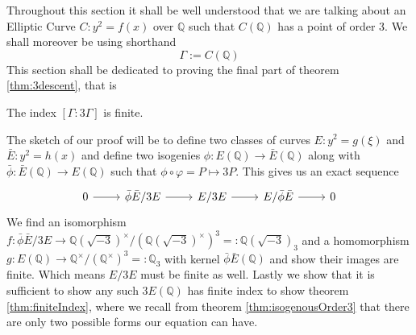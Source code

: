 Throughout this section it shall be well understood that
we are talking about an Elliptic Curve $C: y^2 = f(x)$
over $\mathbb{Q}$ such that $C(\mathbb{Q})$ has a point of order 3.
We shall moreover be using shorthand
\begin{equation*}
  \Gamma := C(\mathbb{Q})
\end{equation*}
This section shall be dedicated to proving the final part of
theorem \ref{thm:3descent}, that is
\begin{theorem} \label{thm:finiteIndex}
  The index $[\Gamma: 3\Gamma]$ is finite.
\end{theorem}
The sketch of our proof will be to define two classes
of curves $E: y^2 = g(\xi)$ and $\bar{E}: y^2 = h(x)$
and define two isogenies $\phi: E(\mathbb{Q}) \to \bar{E}(\mathbb{Q})$
along with $\bar{\phi}: \bar{E}(\mathbb{Q}) \to E(\mathbb{Q})$
such that $\phi \circ \varphi = P \mapsto 3P$.
This gives us an exact sequence
\begin{equation*}
\begin{tikzcd}
  0 \ar[r] & \bar{\phi}\bar{E}/3E \ar[r] & E/3E \ar[r] & E/\bar{\phi}\bar{E} \ar[r] & 0
\end{tikzcd}
\end{equation*}
We find an isomorphism
$f: \bar{\phi}\bar{E}/3E \to \mathbb{Q}(\sqrt{-3})^\times/(\mathbb{Q}(\sqrt{-3})^\times)^3 =: \mathbb{Q}(\sqrt{-3})_3 $
and a homomorphism $g: E(\mathbb{Q}) \to \mathbb{Q}^\times/(\mathbb{Q}^\times)^3 =: \mathbb{Q}_{3}$ with kernel
$\bar{\phi}\bar{E}(\mathbb{Q})$ and show their images are finite.
Which means $E/3E$ must be finite as well.
Lastly we show that it is sufficient
to show any such $3E(\mathbb{Q})$ has
finite index to show theorem \ref{thm:finiteIndex}, where we recall
from theorem \ref{thm:isogenousOrder3} that there are only two
possible forms our equation can have.

